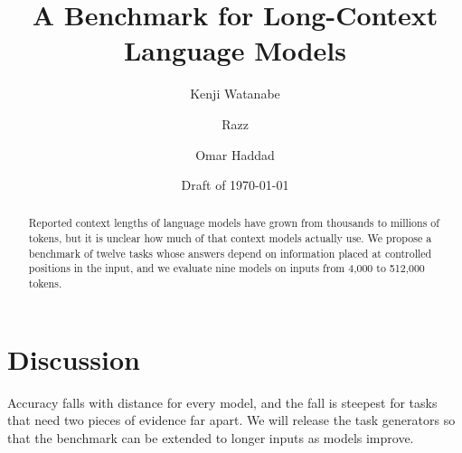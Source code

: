 \documentclass[11pt]{article}
\title{A Benchmark for Long-Context Language Models}
\author{Kenji Watanabe \and Razz \and Omar Haddad}
\date{Draft of \today}
\begin{document}
\maketitle

\begin{abstract}
Reported context lengths of language models have grown from thousands to millions of tokens, but it is unclear how much of that context models actually use. We propose a benchmark of twelve tasks whose answers depend on information placed at controlled positions in the input, and we evaluate nine models on inputs from 4{,}000 to 512{,}000 tokens.
\end{abstract}




\section{Discussion}

Accuracy falls with distance for every model, and the fall is steepest for tasks that need two pieces of evidence far apart. We will release the task generators so that the benchmark can be extended to longer inputs as models improve.
\end{document}
